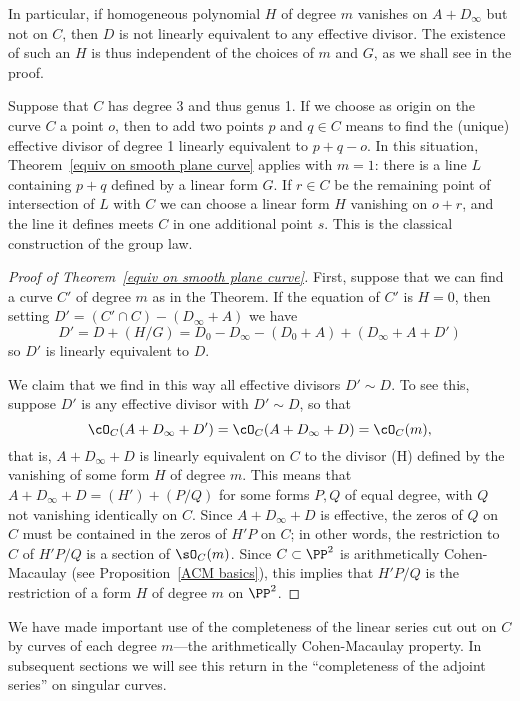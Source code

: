 In particular, if homogeneous polynomial $H$ of degree $m$ vanishes on  $A + D_\infty$ but not on $C$, then $D$ is not linearly equivalent to any effective divisor. The existence of such an $H$ is thus independent of the choices of $m$ and $G$, as we shall see in the proof.

\begin{example}
Suppose that $C$ has degree 3 and thus genus 1. If we choose as origin on the curve $C$ a point $o$, then to add two points $p$ and $q \in C$ means to find the (unique) effective divisor of degree 1 linearly equivalent to $p + q - o$. In this situation, Theorem~\ref{equiv on smooth plane curve} applies with $m=1$: there is a line $L$ 
containing $p+q$ defined by a linear form $G$. If $r \in C$ be the remaining point of intersection of $L$ with $C$ we can choose a linear form $H$ vanishing on $o+r$, and the line it defines meets $C$
in one additional point $s$. This is the classical construction of the group law.
\end{example}

\begin{proof}[Proof of Theorem~\ref{equiv on smooth plane curve}]
First, suppose that we can find a curve $C'$ of degree $m$ as in the Theorem. If the equation of $C'$ is $H=0$,
then  setting $D' = (C'\cap C) -(D_\infty+A)$ we have
$$
D' = D + (H/G) = D_0- D_\infty - (D_0+A)+(D_\infty+A+D')
$$
so $D'$ is linearly equivalent to $D$. 

We claim that we find in this way all effective divisors $D' \sim D$. 
To see this, suppose $D'$ is any effective divisor with $D' \sim D$, so that
$$
\cO_C(A+D_\infty+D') = \cO_C(A+D_\infty+D)  = \cO_C(m),
$$
that is, $A+D_\infty+D$ is linearly equivalent on $C$ to the divisor (H) defined by the vanishing of some form $H$ of degree $m$. 
This means that
$A+D_\infty+D  = (H') +(P/Q)$ for some forms $P,Q$ of equal degree, with $Q$ not vanishing identically on $C$. 
Since $A+D_\infty+D$ is effective,
the zeros of $Q$ on $C$ must be contained in the zeros of $H'P$ on $C$; in other words,
the restriction to $C$ of $H'P/Q$ is a section of $\sO_C(m)$.
Since $C\subset \PP^2$ is arithmetically Cohen-Macaulay (see Proposition~\ref{ACM basics}), this implies that
$H'P/Q$ is the restriction of a form $H$ of degree $m$ on $\PP^2$.
\end{proof}

We have made important use of the completeness of the linear series cut out on $C$ by curves of each degree $m$---the arithmetically
Cohen-Macaulay property. In subsequent sections we will see this return in the ``completeness of the adjoint series'' 
on singular curves.

